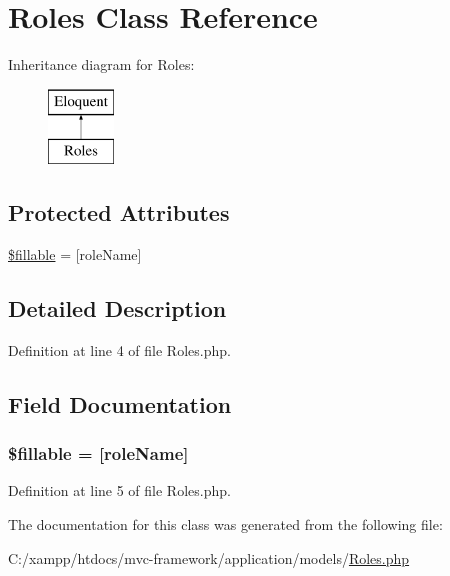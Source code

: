 \hypertarget{class_roles}{}\section{Roles Class Reference}
\label{class_roles}
Inheritance diagram for Roles\+:\begin{figure}[H]
\begin{center}
\leavevmode
\includegraphics[height=2.000000cm]{class_roles}
\end{center}
\end{figure}
\subsection*{Protected Attributes}
\begin{DoxyCompactItemize}
\item 
\hyperlink{class_roles_a6a90e74ccdf5efd70d51d10c906f8e32}{\$fillable} = \mbox{[}\textquotesingle{}role\+Name\textquotesingle{}\mbox{]}
\end{DoxyCompactItemize}


\subsection{Detailed Description}


Definition at line 4 of file Roles.\+php.



\subsection{Field Documentation}
\hypertarget{class_roles_a6a90e74ccdf5efd70d51d10c906f8e32}{}
\subsubsection[{\$fillable}]{\setlength{\rightskip}{0pt plus 5cm}\$fillable = \mbox{[}\textquotesingle{}role\+Name\textquotesingle{}\mbox{]}\hspace{0.3cm}{\ttfamily [protected]}}\label{class_roles_a6a90e74ccdf5efd70d51d10c906f8e32}


Definition at line 5 of file Roles.\+php.



The documentation for this class was generated from the following file\+:\begin{DoxyCompactItemize}
\item 
C\+:/xampp/htdocs/mvc-\/framework/application/models/\hyperlink{_roles_8php}{Roles.\+php}\end{DoxyCompactItemize}
